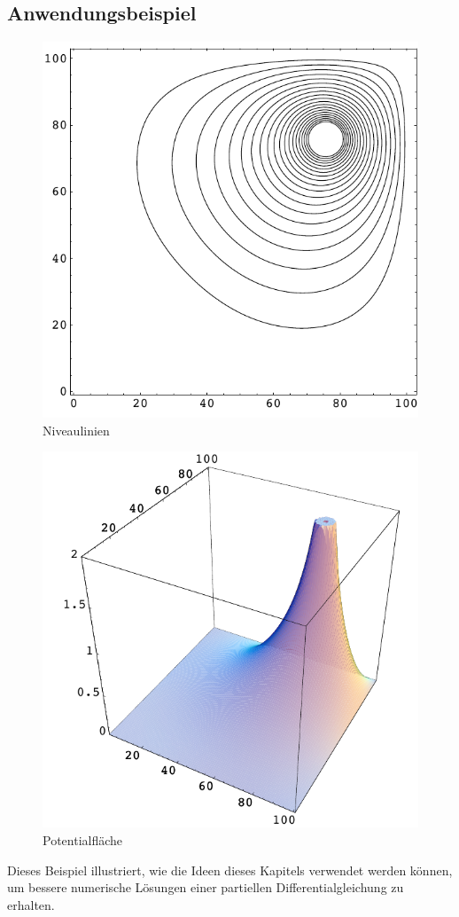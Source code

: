 \subsection{Anwendungsbeispiel}
\begin{figure}
\begin{center}
\includegraphics[width=0.8\hsize]{../common/graphics/neilcontour}
\end{center}
\caption{Niveaulinien\label{neilcontour}}
\end{figure}
\begin{figure}
\begin{center}
\includegraphics[width=0.8\hsize]{../common/graphics/neilloesung}
\end{center}
\caption{Potentialfläche\label{neilloesung}}
\end{figure}
Dieses Beispiel illustriert, wie die Ideen dieses Kapitels verwendet werden können,
um bessere numerische Lösungen einer partiellen Differentialgleichung
zu erhalten.

